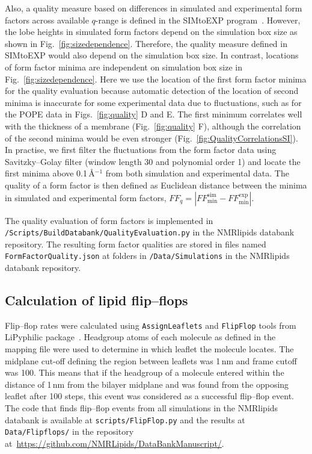 \documentclass[fleqn,10pt]{wlscirep}
\begin{document}
Also, a quality measure based on differences in simulated and experimental form factors across available $q$-range is defined in the SIMtoEXP program~\cite{kucerka10}. However, the lobe heights in simulated form factors depend on the simulation box size as shown in Fig.~\ref{fig:sizedependence}. Therefore, the quality measure defined in SIMtoEXP  would also depend on the simulation box size. In contrast, locations of form factor minima are independent on simulation box size in Fig.~\ref{fig:sizedependence}. Here we use the location of the first form factor minima for the quality evaluation because automatic detection of the location of second minima is inaccurate for some experimental data due to fluctuations, such as for the POPE data in Figs.~\ref{fig:quality} D and E. The first minimum correlates well with the thickness of a membrane (Fig.~\ref{fig:quality} F), although the correlation of the second minima would be even stronger (Fig.~\ref{fig:QualityCorrelationsSI}). In practise, we first filter the fluctuations from the form factor data using Savitzky--Golay filter (window length 30 and polynomial order 1) and locate the first minima above 0.1\,\AA$^{-1}$ from both simulation and experimental data. The quality of a form factor is then defined as Euclidean distance between the minima in simulated and experimental form factors, $FF_q = |FF_\mathrm{min}^\mathrm{sim}-FF_\mathrm{min}^\mathrm{exp}|$. 

The quality evaluation of form factors is implemented in \texttt{/Scripts/BuildDatabank/QualityEvaluation.py} in the NMRlipids databank repository. The resulting form factor qualities are stored in files named \texttt{FormFactorQuality.json} at folders in \texttt{/Data/Simulations} in the NMRlipids databank repository.


\subsection{Calculation of lipid flip--flops}
Flip--flop rates were calculated using \texttt{AssignLeaflets} and \texttt{FlipFlop} tools from LiPyphilic package~\cite{LiPyphilic2021}. Headgroup atoms of each molecule as defined in the mapping file were used to determine in which leaflet the molecule locates. The midplane cut-off defining the region between leaflets was 1\,nm and frame cutoff was 100. This means that if the headgroup of a molecule entered within the distance of 1\,nm from the bilayer midplane and was found from the opposing leaflet after 100 steps, this event was considered as a successful flip--flop event. The code that finds flip--flop events from all simulations in the NMRlipids databank is available at \texttt{scripts/FlipFlop.py} and the results at \texttt{Data/Flipflops/} in the repository at~\url{https://github.com/NMRLipids/DataBankManuscript/}. 
\end{document}
